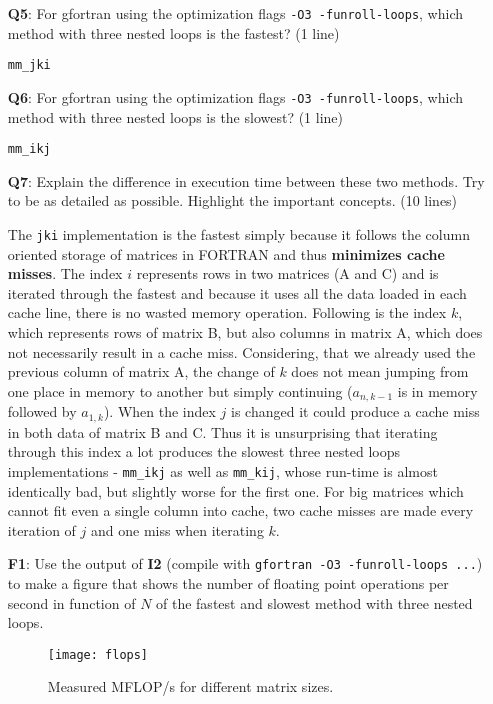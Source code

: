 \documentclass[a4paper]{article}
\newcommand{\answer}[1]{\vspace{-0.75em}\begin{framed} #1 \end{framed}\vspace{-0.75em}}
\begin{document}
\begin{itemize}
{	}
	\item[\textbf{Q5}:] For gfortran using the optimization flags \texttt{-O3 -funroll-loops}, which method with three nested loops is the fastest? (1 line)
	\answer{\texttt{mm\_jki}}
	\item[\textbf{Q6}:] For gfortran using the optimization flags \texttt{-O3 -funroll-loops}, which method with three nested loops is the slowest? (1 line)
	\answer{\texttt{mm\_ikj}}
	\item[\textbf{Q7}:] Explain the difference in execution time between these two methods. Try to be as detailed as possible. Highlight the important concepts. (10 lines)  
	\answer{
	The \texttt{jki} implementation is the fastest simply because it follows the column oriented storage of matrices in FORTRAN and thus \textbf{minimizes cache misses}. The index $ i $ represents rows in two matrices (A and C) and is iterated through the fastest and because it uses all the data loaded in each cache line, there is no wasted memory operation. Following is the index $ k $, which represents rows of matrix B, but also columns in matrix A, which does not necessarily result in a cache miss. Considering, that we already used the previous column of matrix A, the change of $ k $ does not mean jumping from one place in memory to another but simply continuing ($ a_{n,k-1} $ is in memory followed by $ a_{1,k} $). When the index $ j $ is changed it could produce a cache miss in both data of matrix B and C. Thus it is unsurprising that iterating through this index a lot produces the slowest three nested loops implementations - \texttt{mm\_ikj} as well as \texttt{mm\_kij}, whose run-time is almost identically bad, but slightly worse for the first one. For big matrices which cannot fit even a single column into cache, two cache misses are made every iteration of $ j $ and one miss when iterating $ k $. 
}
	\item[\textbf{F1}:] Use the output of \textbf{I2} (compile with \texttt{gfortran -O3 -funroll-loops ...}) to make a figure that shows the number of floating point operations per second in function of $N$ of the fastest and slowest method with three nested loops.
	\begin{figure}[h]
		\centering
		\texttt{[image: flops]}
		\caption[Three nested loops]{Measured MFLOP/s for different matrix sizes.}
		\label{fig:flops}
	\end{figure}
			

\end{itemize}
\end{document}
